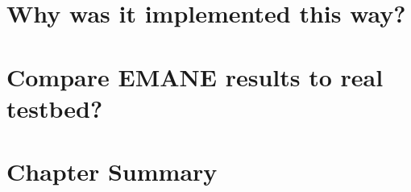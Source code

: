

\section{Why was it implemented this way?}


\section{Compare EMANE results to real testbed?}

\section{Chapter Summary}

